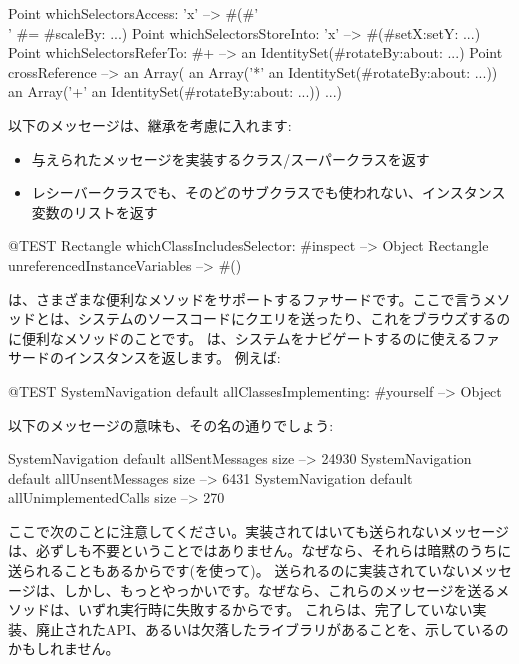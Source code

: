 \documentclass[a4paper,10pt,twoside]{book}
\begin{document}
\begin{code}{} %
Point whichSelectorsAccess: 'x'    --> #(#'\\' #= #scaleBy: ...)
Point whichSelectorsStoreInto: 'x' --> #(#setX:setY: ...)
Point whichSelectorsReferTo: #+  --> an IdentitySet(#rotateBy:about: ...)
Point crossReference --> an Array(
		an Array('*' an IdentitySet(#rotateBy:about: ...))
		an Array('+' an IdentitySet(#rotateBy:about: ...))
		...)
\end{code}

以下のメッセージは、継承を考慮に入れます:
\begin{itemize}
\item {} 与えられたメッセージを実装するクラス/スーパークラスを返す
\item {} レシーバークラスでも、そのどのサブクラスでも使われない、インスタンス変数のリストを返す
\end{itemize}

\begin{code}{@TEST}
Rectangle whichClassIncludesSelector: #inspect --> Object
Rectangle unreferencedInstanceVariables            --> #()
\end{code}

は、さまざまな便利なメソッドをサポートするファサードです。ここで言うメソッドとは、システムのソースコードにクエリを送ったり、これをブラウズするのに便利なメソッドのことです。
 は、システムをナビゲートするのに使えるファサードのインスタンスを返します。
例えば:

\begin{code}{@TEST}
SystemNavigation default allClassesImplementing: #yourself --> {Object}
\end{code}

以下のメッセージの意味も、その名の通りでしょう:

\begin{code}{}
SystemNavigation default allSentMessages size          --> 24930
SystemNavigation default allUnsentMessages size      --> 6431
SystemNavigation default allUnimplementedCalls size --> 270
\end{code}

ここで次のことに注意してください。実装されてはいても送られないメッセージは、必ずしも不要ということではありません。なぜなら、それらは暗黙のうちに送られることもあるからです(\eg {}を使って)。
送られるのに実装されていないメッセージは、しかし、もっとやっかいです。なぜなら、これらのメッセージを送るメソッドは、いずれ実行時に失敗するからです。
これらは、完了していない実装、廃止されたAPI、あるいは欠落したライブラリがあることを、示しているのかもしれません。
\end{document}

